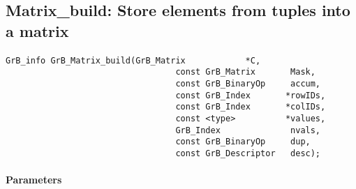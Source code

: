 \subsection{{\sf Matrix\_build}: Store elements from tuples into a matrix}
\label{Sec:Matrix_build}

\paragraph{\syntax}

\begin{Verbatim}[samepage=true]    
        GrB_info GrB_Matrix_build(GrB_Matrix            *C,
                                  const GrB_Matrix       Mask,
                                  const GrB_BinaryOp     accum,
                                  const GrB_Index       *rowIDs,
                                  const GrB_Index       *colIDs, 
                                  const <type>          *values,
                                  GrB_Index              nvals,
                                  const GrB_BinaryOp     dup,
                                  const GrB_Descriptor   desc);
\end{Verbatim}

\paragraph{Parameters}

